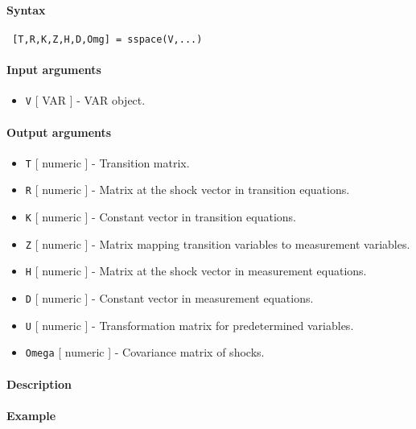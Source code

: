 


	\paragraph{Syntax}
 
 \begin{verbatim}
 [T,R,K,Z,H,D,Omg] = sspace(V,...)
 \end{verbatim}
 
 \paragraph{Input arguments}
 
 \begin{itemize}
 \item
   \texttt{V} {[} VAR {]} - VAR object.
 \end{itemize}
 
 \paragraph{Output arguments}
 
 \begin{itemize}
 \item
   \texttt{T} {[} numeric {]} - Transition matrix.
 \item
   \texttt{R} {[} numeric {]} - Matrix at the shock vector in transition
   equations.
 \item
   \texttt{K} {[} numeric {]} - Constant vector in transition equations.
 \item
   \texttt{Z} {[} numeric {]} - Matrix mapping transition variables to
   measurement variables.
 \item
   \texttt{H} {[} numeric {]} - Matrix at the shock vector in measurement
   equations.
 \item
   \texttt{D} {[} numeric {]} - Constant vector in measurement equations.
 \item
   \texttt{U} {[} numeric {]} - Transformation matrix for predetermined
   variables.
 \item
   \texttt{Omega} {[} numeric {]} - Covariance matrix of shocks.
 \end{itemize}
 
 \paragraph{Description}
 
 \paragraph{Example}


